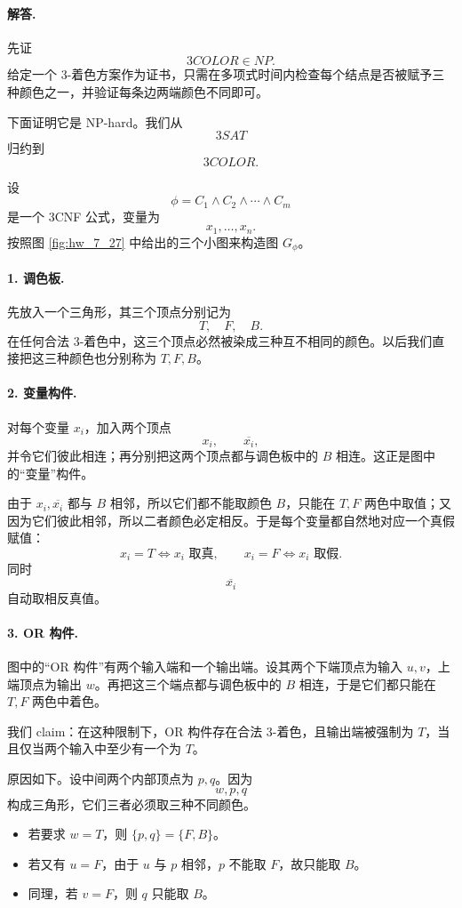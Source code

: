 \begin{answerred}
\paragraph{解答.}
先证
\[
3COLOR\in NP.
\]
给定一个 3-着色方案作为证书，只需在多项式时间内检查每个结点是否被赋予三种颜色之一，并验证每条边两端颜色不同即可。

\medskip
下面证明它是 NP-hard。我们从
\[
3SAT
\]
归约到
\[
3COLOR.
\]

\medskip
设
\[
\phi=C_1\wedge C_2\wedge\cdots\wedge C_m
\]
是一个 3CNF 公式，变量为
\[
x_1,\dots,x_n.
\]
按照图 \ref{fig:hw_7_27} 中给出的三个小图来构造图 $G_\phi$。

\paragraph{1. 调色板.}
先放入一个三角形，其三个顶点分别记为
\[
T,\quad F,\quad B.
\]
在任何合法 3-着色中，这三个顶点必然被染成三种互不相同的颜色。以后我们直接把这三种颜色也分别称为 $T,F,B$。

\paragraph{2. 变量构件.}
对每个变量 $x_i$，加入两个顶点
\[
x_i,\qquad \overline{x_i},
\]
并令它们彼此相连；再分别把这两个顶点都与调色板中的 $B$ 相连。这正是图中的“变量”构件。

由于 $x_i,\overline{x_i}$ 都与 $B$ 相邻，所以它们都不能取颜色 $B$，只能在 $T,F$ 两色中取值；又因为它们彼此相邻，所以二者颜色必定相反。于是每个变量都自然地对应一个真假赋值：
\[
x_i=T \Longleftrightarrow x_i \text{ 取真},\qquad
x_i=F \Longleftrightarrow x_i \text{ 取假}.
\]
同时
\[
\overline{x_i}
\]
自动取相反真值。

\paragraph{3. OR 构件.}
图中的“OR 构件”有两个输入端和一个输出端。设其两个下端顶点为输入 $u,v$，上端顶点为输出 $w$。再把这三个端点都与调色板中的 $B$ 相连，于是它们都只能在 $T,F$ 两色中着色。

我们 claim：在这种限制下，OR 构件存在合法 3-着色，且输出端被强制为 $T$，当且仅当两个输入中至少有一个为 $T$。

\medskip
原因如下。设中间两个内部顶点为 $p,q$。因为
\[
w,p,q
\]
构成三角形，它们三者必须取三种不同颜色。

\begin{itemize}
  \item 若要求 $w=T$，则 $\{p,q\}=\{F,B\}$。
  \item 若又有 $u=F$，由于 $u$ 与 $p$ 相邻，$p$ 不能取 $F$，故只能取 $B$。
  \item 同理，若 $v=F$，则 $q$ 只能取 $B$。
\end{itemize}


\end{answerred}
